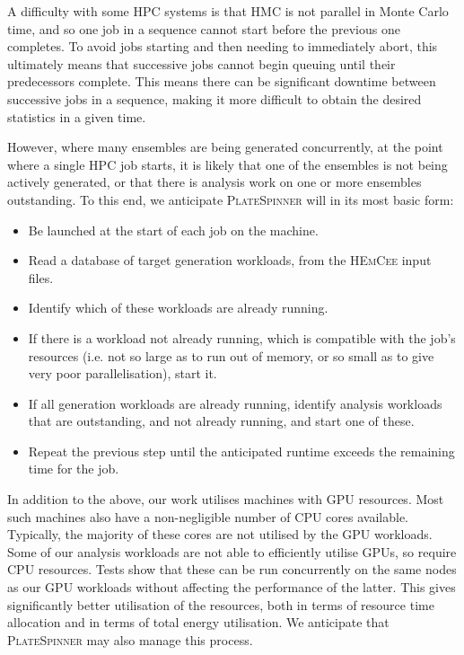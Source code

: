 \documentclass{article}
\newcommand\program[1]{\textsc{#1}\xspace}
\begin{document}
A difficulty with some HPC systems is that
HMC is not parallel in Monte Carlo time,
and so one job in a sequence cannot start before the previous one completes.
To avoid jobs starting and then needing to immediately abort,
this ultimately means that successive jobs cannot begin queuing until
their predecessors complete.
This means there can be significant downtime between successive jobs in a sequence,
making it more difficult to obtain the desired statistics in a given time.

However,
where many ensembles are being generated concurrently,
at the point where a single HPC job starts,
it is likely that one of the ensembles is not being actively generated,
or that there is analysis work on one or more ensembles outstanding.
To this end,
we anticipate \program{PlateSpinner} will in its most basic form:

\begin{itemize}
  \item
        Be launched at the start of each job on the machine.
  \item
        Read a database of target generation workloads,
        from the \program{HEmCee} input files.
  \item
        Identify which of these workloads are already running.
  \item
        If there is a workload not already running,
        which is compatible with the job's resources
        (i.e. not so large as to run out of memory,
        or so small as to give very poor parallelisation),
        start it.
  \item
        If all generation workloads are already running,
        identify analysis workloads that are outstanding,
        and not already running,
        and start one of these.
  \item
        Repeat the previous step until
        the anticipated runtime exceeds the remaining time for the job.
\end{itemize}

In addition to the above,
our work utilises machines with GPU resources.
Most such machines also have a non-negligible number of CPU cores available.
Typically,
the majority of these cores are not utilised by the GPU workloads.
Some of our analysis workloads are not able to efficiently utilise GPUs,
so require CPU resources.
Tests show that these can be run concurrently on the same nodes as our GPU workloads
without affecting the performance of the latter.
This gives significantly better utilisation of the resources,
both in terms of resource time allocation
and in terms of total energy utilisation.
We anticipate that \program{PlateSpinner} may also manage this process.
\end{document}
